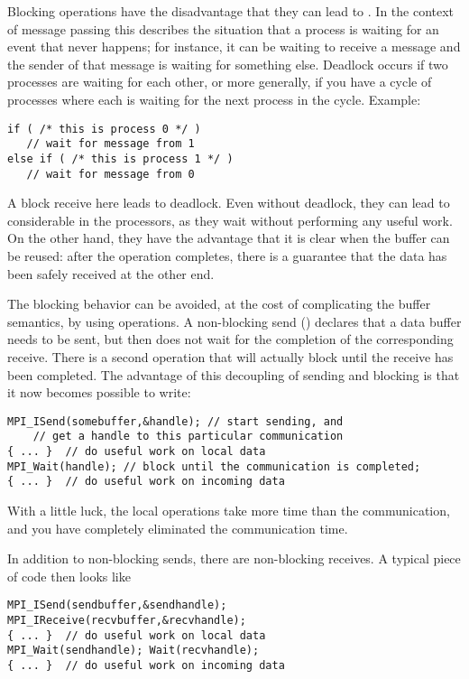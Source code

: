 Blocking operations have the disadvantage that they can lead to
. In the context of message passing this
describes the situation that a process is waiting for an event that
never happens; for instance, it can be waiting to receive a message
and the sender of that message is waiting for something else.
Deadlock occurs if two processes are waiting
for each other, or more generally, if you have a cycle of processes
where each is waiting for the next process in the cycle. Example:
\begin{verbatim}
if ( /* this is process 0 */ )
   // wait for message from 1
else if ( /* this is process 1 */ )
   // wait for message from 0
\end{verbatim}
A block receive here leads to deadlock.
Even without deadlock, they can lead to considerable  in the processors, as they wait without performing any useful work.
On the other hand,  they have the advantage that it is clear when the
buffer can be reused: after the operation completes, there is a
guarantee that the data has been safely received at the other end.

The blocking behavior can be avoided, at the cost of complicating the
buffer semantics, by using  operations. A
non-blocking send () declares that a data buffer needs to
be sent, but then does not wait for the completion of the
corresponding receive. There is a second operation  that
will actually block until the receive has been completed. The
advantage of this decoupling of sending and blocking is that it now
becomes possible to write:
\begin{verbatim}
MPI_ISend(somebuffer,&handle); // start sending, and
    // get a handle to this particular communication
{ ... }  // do useful work on local data
MPI_Wait(handle); // block until the communication is completed;
{ ... }  // do useful work on incoming data
\end{verbatim}
With a little luck, the local operations take more time than the
communication, and you have completely eliminated the communication
time.

In addition to non-blocking sends, there are non-blocking receives. A
typical piece of code then looks like
\begin{verbatim}
MPI_ISend(sendbuffer,&sendhandle);
MPI_IReceive(recvbuffer,&recvhandle);
{ ... }  // do useful work on local data
MPI_Wait(sendhandle); Wait(recvhandle);
{ ... }  // do useful work on incoming data
\end{verbatim}

